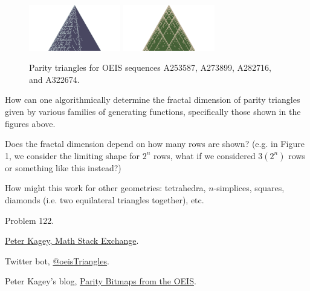 \documentclass{article}
\begin{document}
\begin{figure}[ht!]
\includegraphics[trim={800 0 800 0}, clip, width=4cm]{assets/128_problem/A282716_2022-09-18.png}
\includegraphics[trim={800 0 800 0}, clip, width=4cm]{assets/128_problem/A322674_2021-10-03.png}
\caption{
  Parity triangles for OEIS sequences A253587, A273899, A282716, and A322674.
}
\end{figure}

\begin{question}
  How can one algorithmically determine the fractal dimension of parity
  triangles given by various families of generating functions, specifically
  those shown in the figures above.
\end{question}

\begin{related}
  \item Does the fractal dimension depend on how many rows are shown?
  (e.g. in Figure 1, we consider the limiting shape for $2^n$ rows, what if we
  considered $3(2^n)$ rows or something like this instead?)
  \item How might this work for other geometries: tetrahedra,
  $n$-simplices, squares, diamonds (i.e. two equilateral triangles together), etc.
\end{related}

\begin{references}
  \item Problem 122.
  \item \href{https://math.stackexchange.com/q/4554568/121988}{Peter Kagey, Math Stack Exchange}.
  \item Twitter bot, \href{https://twitter.com/oeisTriangles}{@oeisTriangles}.
  \item Peter Kagey's blog, \href{https://blog.peterkagey.com/2021/03/parity-bitmaps-from-the-oeis/}{Parity Bitmaps from the OEIS}.
\end{references}
\end{document}

